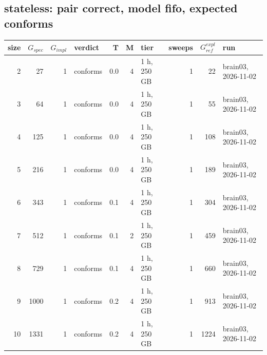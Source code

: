 \documentclass[10pt]{article}
\begin{document}
\subsection*{stateless: pair \textsf{correct}, model fifo, expected conforms}
\begin{longtable}{@{}rrrlrrlrrl@{}}
\toprule
size & $G_{\mathit{spec}}$ & $G_{\mathit{impl}}$ & verdict & T & M & tier & sweeps & $G_{\mathit{ref}}^{\mathit{expl}}$ & run \\
\midrule
\endhead
\color{blue} 2 & 27 & 1 & conforms & 0.0 & 4 & 1 h, 250 GB & 1 & 22 & brain03, 2026-11-02 \\
\color{blue} 3 & 64 & 1 & conforms & 0.0 & 4 & 1 h, 250 GB & 1 & 55 & brain03, 2026-11-02 \\
\color{blue} 4 & 125 & 1 & conforms & 0.0 & 4 & 1 h, 250 GB & 1 & 108 & brain03, 2026-11-02 \\
\color{blue} 5 & 216 & 1 & conforms & 0.0 & 4 & 1 h, 250 GB & 1 & 189 & brain03, 2026-11-02 \\
\color{blue} 6 & 343 & 1 & conforms & 0.1 & 4 & 1 h, 250 GB & 1 & 304 & brain03, 2026-11-02 \\
\color{blue} 7 & 512 & 1 & conforms & 0.1 & 2 & 1 h, 250 GB & 1 & 459 & brain03, 2026-11-02 \\
\color{blue} 8 & 729 & 1 & conforms & 0.1 & 4 & 1 h, 250 GB & 1 & 660 & brain03, 2026-11-02 \\
\color{blue} 9 & 1000 & 1 & conforms & 0.2 & 4 & 1 h, 250 GB & 1 & 913 & brain03, 2026-11-02 \\
\color{blue} 10 & 1331 & 1 & conforms & 0.2 & 4 & 1 h, 250 GB & 1 & 1224 & brain03, 2026-11-02 \\
\bottomrule
\end{longtable}
\end{document}
